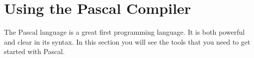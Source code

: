 \def\pageLang{pas}
\section{Using the Pascal Compiler} %
\label{sec:the_pascal_compiler}

The Pascal language is a great first programming language. It is both powerful and clear in its syntax. In this section you will see the tools that you need to get started with Pascal.




